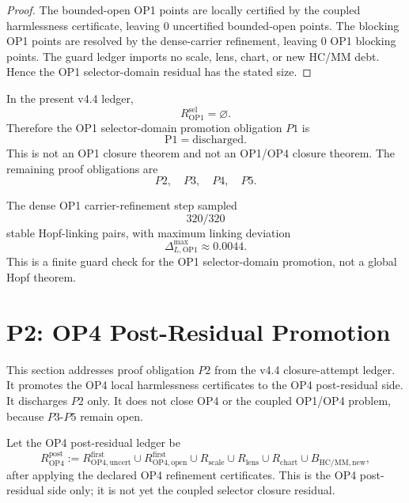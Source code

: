 \begin{proof}
The bounded-open OP1 points are locally certified by the coupled harmlessness
certificate, leaving \(0\) uncertified bounded-open points.  The
blocking OP1 points are resolved by the dense-carrier refinement, leaving
\(0\) OP1 blocking points.  The guard ledger imports no scale,
lens, chart, or new HC/MM debt.  Hence the OP1 selector-domain residual has
the stated size.
\end{proof}

\begin{theorem}[P1 discharge]
In the present v4.4 ledger,
\[
    R_{\mathrm{OP1}}^{\mathrm{sel}}=\varnothing.
\]
Therefore the OP1 selector-domain promotion obligation \(P1\) is
\[
    \mathrm{P1}=\mathrm{discharged}.
\]
This is not an OP1 closure theorem and not an OP1/OP4 closure theorem.  The
remaining proof obligations are
\[
    P2,\quad P3,\quad P4,\quad P5.
\]
\end{theorem}

\begin{remark}
The dense OP1 carrier-refinement step sampled
\[
    320/320
\]
stable Hopf-linking pairs, with maximum linking deviation
\[
    \Delta_{L,\mathrm{OP1}}^{\max}\approx 0.0044.
\]
This is a finite guard check for the OP1 selector-domain promotion, not a
global Hopf theorem.
\end{remark}



\section{P2: OP4 Post-Residual Promotion}
\label{sec:v45-p2-op4-post-residual-promotion}

This section addresses proof obligation \(P2\) from the v4.4 closure-attempt
ledger.  It promotes the OP4 local harmlessness certificates to the OP4
post-residual side.  It discharges \(P2\) only.  It does not close OP4 or the
coupled OP1/OP4 problem, because \(P3\)-\(P5\) remain open.

\begin{definition}
Let the OP4 post-residual ledger be
\[
    R_{\mathrm{OP4}}^{\mathrm{post}}
    :=
    R_{\mathrm{OP4,uncert}}^{\mathrm{first}}
    \cup
    R_{\mathrm{OP4,open}}^{\mathrm{first}}
    \cup
    R_{\mathrm{scale}}
    \cup
    R_{\mathrm{lens}}
    \cup
    R_{\mathrm{chart}}
    \cup
    B_{\mathrm{HC/MM,new}},
\]
after applying the declared OP4 refinement certificates.  This is the OP4
post-residual side only; it is not yet the coupled selector closure residual.
\end{definition}


